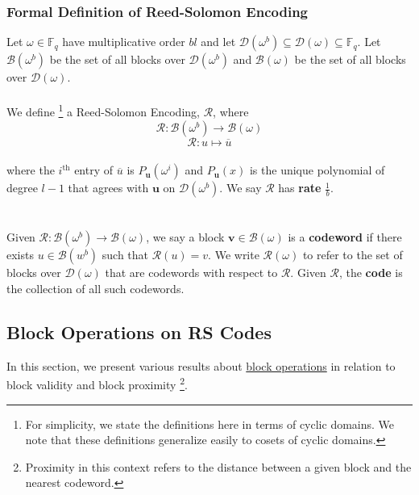 \documentclass[10pt,letterpaper,titlepage]{article}
\newcommand{\GF}[1]{\mathbb{F}_{#1}}
\newcommand{\w}[0]{\omega}
\newcommand{\D}[0]{\mathcal{D}}
\theoremstyle{definition}
\begin{document}
\begin{appendices}
\subsubsection{Formal Definition of Reed-Solomon Encoding}
Let $\w\in\GF{q}$ have multiplicative order $bl$ and let $\D(\w^b)\subseteq\D(\omega)\subseteq\GF{q}$.
Let $\mathcal{B}(\w^b)$ be the set of all blocks over $\D(\w^b)$ and $\mathcal{B}(\w)$ be the set of all blocks over $\D(\w)$.\\
\\
We define%
\footnote{For simplicity, we state the definitions here in terms of cyclic domains.
We note that these definitions generalize easily to cosets of cyclic domains.}
a Reed-Solomon Encoding, $\mathcal{R}$, where
\[\mathcal{R}:\mathcal{B}(\w^b)\to\mathcal{B}(\w)\]
\[\mathcal{R}:u\mapsto \overline{u}\]
\\
where the $i^\text{th}$ entry of $\overline{u}$ is $P_\mathbf{u}(\omega^i)$ and $P_\mathbf{u}(x)$ is the unique polynomial of degree $l-1$ that agrees with $\mathbf{u}$ on $\D(\w^b)$.
We say $\mathcal{R}$ has \textbf{rate} $\frac{1}{b}$. \\
\\ \label{valid}
\\
Given $\mathcal{R}:\mathcal{B}(\w^b)\to\mathcal{B}(\w)$, we say a block $\mathbf{v}\in\mathcal{B}(\w)$ is a \textbf{codeword} if there exists $u\in\mathcal{B}(w^b)$ such that $\mathcal{R}(u)=v$.
We write $\mathcal{R}(\w)$ to refer to the set of blocks over $\D(\w)$ that are codewords with respect to $\mathcal{R}$.
Given $\mathcal{R}$, the \textbf{code} is the collection of all such codewords.

\subsection{Block Operations on RS Codes}
In this section, we present various results about \hyperref[blocks]{block operations} in relation to block validity and block proximity%
\footnote{Proximity in this context refers to the distance between a given block and the nearest codeword.}.

\end{appendices}
\end{document}
